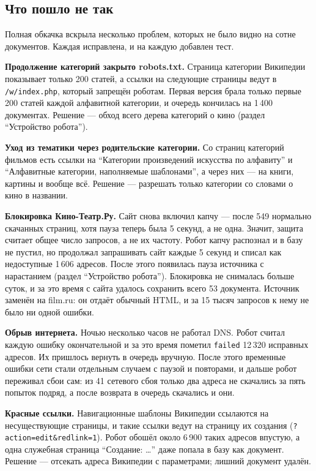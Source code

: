 \subsection*{Что пошло не так}

Полная обкачка вскрыла несколько проблем, которых не было видно на сотне
документов. Каждая исправлена, и на каждую добавлен тест.

\textbf{Продолжение категорий закрыто robots.txt.} Страница категории
Википедии показывает только 200 статей, а ссылки на следующие страницы ведут в
\texttt{/w/index.php}, который запрещён роботам. Первая версия брала только
первые 200 статей каждой алфавитной категории, и очередь кончилась на 1\,400
документах. Решение --- обход всего дерева категорий о кино (раздел
\enquote{Устройство робота}).

\textbf{Уход из тематики через родительские категории.} Со страниц категорий фильмов
есть ссылки на \enquote{Категории произведений искусства по алфавиту} и
\enquote{Алфавитные категории, наполняемые шаблонами}, а через них --- на книги,
картины и вообще всё. Решение --- разрешать только категории со словами о кино в
названии.

\textbf{Блокировка Кино-Театр.Ру.} Сайт снова включил капчу --- после 549
нормально скачанных страниц, хотя пауза теперь была 5 секунд, а не одна. Значит,
защита считает общее число запросов, а не их частоту. Робот капчу распознал и в
базу не пустил, но продолжал запрашивать сайт каждые 5 секунд и списал как
недоступные 1\,606 адресов. После этого появилась пауза источника с нарастанием
(раздел \enquote{Устройство робота}). Блокировка не снималась больше суток, и за это
время с сайта удалось сохранить всего 53 документа. Источник заменён на
film.ru: он отдаёт обычный HTML, и за 15 тысяч запросов к нему не было ни одной
ошибки.

\textbf{Обрыв интернета.} Ночью несколько часов не работал DNS. Робот считал
каждую ошибку окончательной и за это время пометил \texttt{failed} 12\,320
исправных адресов. Их пришлось вернуть в очередь вручную. После этого временные
ошибки сети стали отдельным случаем с паузой и повторами, и дальше робот
переживал сбои сам: из 41 сетевого сбоя только два адреса не скачались за пять
попыток подряд, а после возврата в очередь скачались и они.

\textbf{Красные ссылки.} Навигационные шаблоны Википедии ссылаются на
несуществующие страницы, и такие ссылки ведут на страницу их создания
(\texttt{?action=edit\&redlink=1}). Робот обошёл около 6\,900 таких адресов
впустую, а одна служебная страница \enquote{Создание: \ldots} даже попала в базу
как документ. Решение --- отсекать адреса Википедии с параметрами; лишний документ
удалён.

